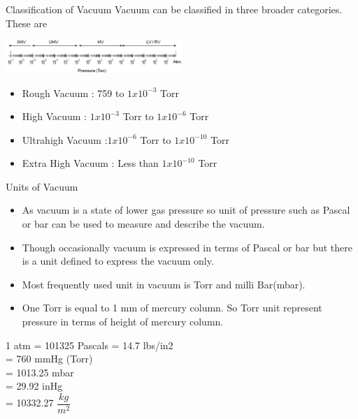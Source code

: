 \documentclass[11]{beamer}
\begin{document}
\begin{frame}{Classification of Vacuum}
Vacuum can be classified in three broader categories. These are 
\begin{center}
\includegraphics[width=0.5\textwidth]{Vacuum_Scale.png}
\end{center}

\begin{block}{}
	\begin{itemize}
		\item  Rough Vacuum :  759 to $1x 10^{-3}$ Torr
		\item  High Vacuum   :  $1x 10^{-3}$ Torr to $1x 10^{-6}$  Torr
		\item  Ultrahigh Vacuum  :$1x 10^{-6}$  Torr to $1x 10^{-10}$ Torr
		\item  Extra High Vacuum : Less than $1x 10^{-10}$ Torr
	\end{itemize}

\end{block}

\end{frame}

\begin{frame}{Units of Vacuum}

\begin{itemize}
  \item As vacuum is a state of lower gas pressure so unit of pressure such as Pascal or bar can be used to measure and describe the vacuum. 
  \item Though occasionally vacuum is expressed in terms of Pascal or bar but there is a unit defined to express the vacuum only.
  \item Most frequently used unit in vacuum is Torr and milli Bar(mbar).
  \item One Torr is equal to 1 mm of mercury column. So Torr unit represent pressure in terms of height of mercury column.
\end{itemize}
     

 1 atm = 101325 Pascals 
  \hspace{1cm}          = 14.7 lbs/in2 \\
  \hspace{1cm}          = 760 mmHg (Torr)\\
  \hspace{1cm}          = 1013.25 mbar\\
  \hspace{1cm}          = 29.92 inHg\\
  \hspace{1cm}          = 10332.27 $\dfrac{kg}{m^2} $ \\



\end{frame}
\end{document}

